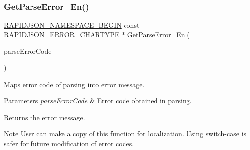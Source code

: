 \subsubsection{\texorpdfstring{Get\+Parse\+Error\+\_\+\+En()}{GetParseError\_En()}}
{\footnotesize\ttfamily \hyperlink{group__RAPIDJSON__CONFIG_gad3806c8251fdc7da9618b7e922674ffc}{R\+A\+P\+I\+D\+J\+S\+O\+N\+\_\+\+N\+A\+M\+E\+S\+P\+A\+C\+E\+\_\+\+B\+E\+G\+IN} const \hyperlink{group__RAPIDJSON__ERRORS_ga7e4636fd48d0148f102b8a13f0539d8c}{R\+A\+P\+I\+D\+J\+S\+O\+N\+\_\+\+E\+R\+R\+O\+R\+\_\+\+C\+H\+A\+R\+T\+Y\+PE} $\ast$ Get\+Parse\+Error\+\_\+\+En (\begin{DoxyParamCaption}\item[{\hyperlink{group__RAPIDJSON__ERRORS_ga8d4b32dfc45840bca189ade2bbcb6ba7}{Parse\+Error\+Code}}]{parse\+Error\+Code }\end{DoxyParamCaption})\hspace{0.3cm}{\ttfamily [inline]}}



Maps error code of parsing into error message. 


\begin{DoxyParams}{Parameters}
{\em parse\+Error\+Code} & Error code obtained in parsing. \\
\hline
\end{DoxyParams}
\begin{DoxyReturn}{Returns}
the error message. 
\end{DoxyReturn}
\begin{DoxyNote}{Note}
User can make a copy of this function for localization. Using switch-\/case is safer for future modification of error codes. 
\end{DoxyNote}
